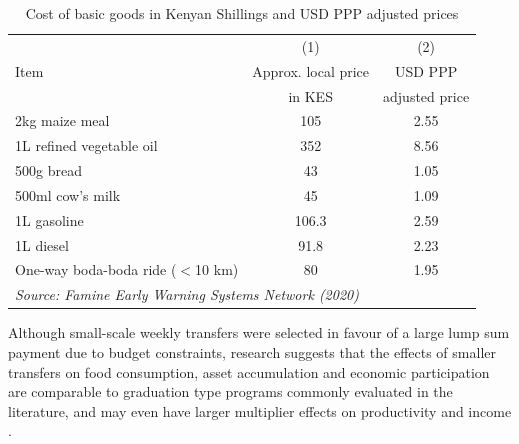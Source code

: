 \documentclass[12pt]{article}
\begin{document}
\begin{table}[h]
    \centering
    \caption{Cost of basic goods in Kenyan Shillings and USD PPP adjusted prices}
    \label{tab:tab1}
    \begin{tabular}{p{3.5in}cc} \hline
     & (1) & (2) \\
    Item & Approx. local price & USD PPP \\
	 & in KES & adjusted price \\ \hline
    2kg maize meal & 105 & 2.55 \\
    1L refined vegetable oil & 352 & 8.56 \\
    500g bread & 43 & 1.05 \\
    500ml cow's milk & 45 & 1.09 \\
    1L gasoline & 106.3 & 2.59 \\
    1L diesel & 91.8 & 2.23 \\
    One-way boda-boda ride ($<$10 km) & 80 & 1.95 \\ \hline
    \multicolumn{2}{l}{\textit{Source: Famine Early Warning Systems Network (2020)}} \\
    \end{tabular}
\end{table}

Although small-scale weekly transfers were selected in favour of a large lump sum payment due to budget constraints, research suggests that the effects of smaller transfers on food consumption, asset accumulation and economic participation are comparable to graduation type programs commonly evaluated in the literature, and may even have larger multiplier effects on productivity and income \citep{handa2018can}.
\end{document}
